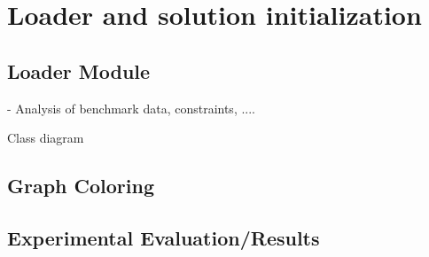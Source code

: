 \chapter{Loader and solution initialization}
\label{implementation}
\thispagestyle{plain}

\section{Loader Module}

- Analysis of benchmark data, constraints, ....

Class diagram


\section{Graph Coloring}


\section{Experimental Evaluation/Results}